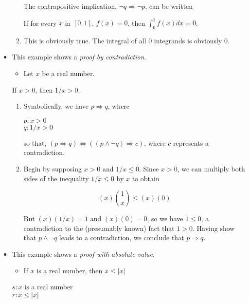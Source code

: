\documentclass[12pt]{article}
\newcommand\int[1]{\text{int }#1}
\newcommand\abs[1]{\left|#1\right|}
\begin{document}
\begin{itemize}
\begin{enumerate}
The contrapositive implication, \(\neg{}q\Rightarrow{}\neg{}p\), can be written
\begin{center}
If for every \(x\) in \([0,1]\), \(f(x)=0\), then \(\int_{0}^{1}f(x)dx=0\).
\end{center}
\item This is obviously true. The integral of all 0 integrands is obviously 0.
\end{enumerate}
\item This example shows a \emph{proof by contradiction}.
\begin{itemize}
\item Let \(x\) be a real number.
\end{itemize}
\begin{center}
If \(x>0\), then \(1/x>0\).
\end{center}

\begin{enumerate}
\item Symbolically, we have \(p\Rightarrow{}q\), where
\begin{center}
\(p: x>0\) \\
\(q: 1/x>0\) \\
\end{center}

so that, \((p\Rightarrow{}q)\Leftrightarrow{}((p\land{}\neg{}q)\Rightarrow{}c)\), where \(c\) represents a contradiction.
\item Begin by supposing \(x>0\) and \(1/x\le0\). Since \(x>0\), we can multiply both
sides of the inequality \(1/x\le{}0\) by \(x\) to obtain
\begin{center}
$$(x)\left(\frac{1}{x}\right)\le(x)(0)$$
\end{center}

But \((x)(1/x)=1\) and \((x)(0)=0\), so we have \(1\le0\), a contradiction to the
(presumably known) fact that \(1>0\). Having show that \(p\land{}\neg{}q\) leads to a
contradiction, we conclude that \(p\Rightarrow{}q\).
\end{enumerate}
\item This example shows a \emph{proof with absolute value}.
\begin{itemize}
\item If \(x\) is a real number, then \(x\le\abs{x}\)
\end{itemize}
\begin{center}
\(s: x\) is a real number \\
\(r: x\le\abs{x}\) \\
\end{center}


\end{itemize}
\end{document}
